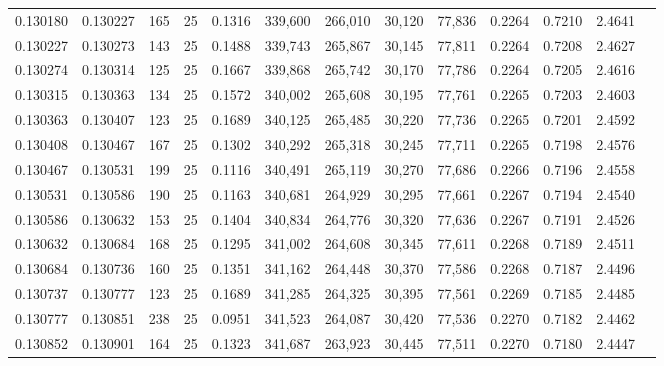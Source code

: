 \begin{tabular}{rrrrrrrrrrrrr}
0.130180 & 0.130227 &   165 &  25 &                                     0.1316 & 339,600 & 266,010 &  30,120 &  77,836 & 0.2264 & 0.7210 & 2.4641 \\
0.130227 & 0.130273 &   143 &  25 &                                     0.1488 & 339,743 & 265,867 &  30,145 &  77,811 & 0.2264 & 0.7208 & 2.4627 \\
0.130274 & 0.130314 &   125 &  25 &                                     0.1667 & 339,868 & 265,742 &  30,170 &  77,786 & 0.2264 & 0.7205 & 2.4616 \\
0.130315 & 0.130363 &   134 &  25 &                                     0.1572 & 340,002 & 265,608 &  30,195 &  77,761 & 0.2265 & 0.7203 & 2.4603 \\
0.130363 & 0.130407 &   123 &  25 &                                     0.1689 & 340,125 & 265,485 &  30,220 &  77,736 & 0.2265 & 0.7201 & 2.4592 \\
0.130408 & 0.130467 &   167 &  25 &                                     0.1302 & 340,292 & 265,318 &  30,245 &  77,711 & 0.2265 & 0.7198 & 2.4576 \\
0.130467 & 0.130531 &   199 &  25 &                                     0.1116 & 340,491 & 265,119 &  30,270 &  77,686 & 0.2266 & 0.7196 & 2.4558 \\
0.130531 & 0.130586 &   190 &  25 &                                     0.1163 & 340,681 & 264,929 &  30,295 &  77,661 & 0.2267 & 0.7194 & 2.4540 \\
0.130586 & 0.130632 &   153 &  25 &                                     0.1404 & 340,834 & 264,776 &  30,320 &  77,636 & 0.2267 & 0.7191 & 2.4526 \\
0.130632 & 0.130684 &   168 &  25 &                                     0.1295 & 341,002 & 264,608 &  30,345 &  77,611 & 0.2268 & 0.7189 & 2.4511 \\
0.130684 & 0.130736 &   160 &  25 &                                     0.1351 & 341,162 & 264,448 &  30,370 &  77,586 & 0.2268 & 0.7187 & 2.4496 \\
0.130737 & 0.130777 &   123 &  25 &                                     0.1689 & 341,285 & 264,325 &  30,395 &  77,561 & 0.2269 & 0.7185 & 2.4485 \\
0.130777 & 0.130851 &   238 &  25 &                                     0.0951 & 341,523 & 264,087 &  30,420 &  77,536 & 0.2270 & 0.7182 & 2.4462 \\
0.130852 & 0.130901 &   164 &  25 &                                     0.1323 & 341,687 & 263,923 &  30,445 &  77,511 & 0.2270 & 0.7180 & 2.4447 \\

\end{tabular}
